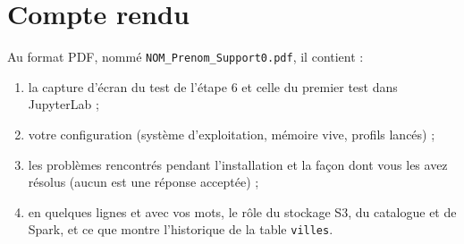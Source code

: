 \documentclass[11pt,a4paper]{article}
\newcommand{\cmd}[1]{\texttt{#1}}
\begin{document}
\section{Compte rendu}\label{sec:cr}

Au format PDF, nommé \cmd{NOM\_Prenom\_Support0.pdf}, il contient :
\begin{enumerate}[leftmargin=*,itemsep=2pt]
  \item la capture d'écran du test de l'étape 6 et celle du premier test dans JupyterLab ;
  \item votre configuration (système d'exploitation, mémoire vive, profils lancés) ;
  \item les problèmes rencontrés pendant l'installation et la façon dont vous les avez résolus
        (\og aucun \fg{} est une réponse acceptée) ;
  \item en quelques lignes et avec vos mots, le rôle du stockage S3, du catalogue et de Spark,
        et ce que montre l'historique de la table \cmd{villes}.
\end{enumerate}
\end{document}
